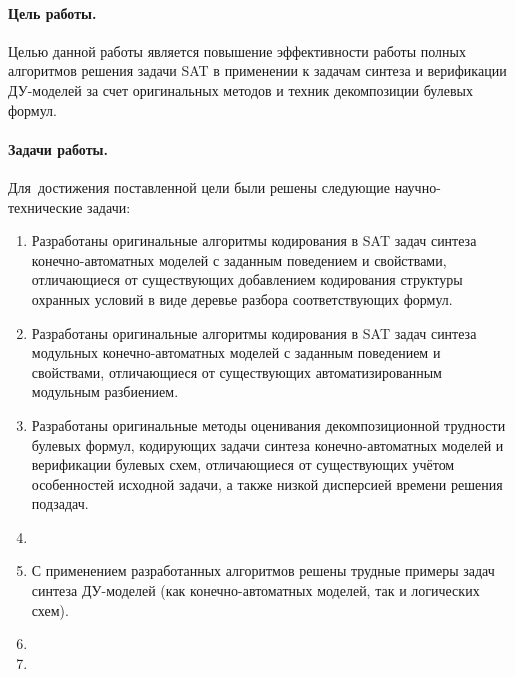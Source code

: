 

\paragraph*{Цель работы.}
%
Целью данной работы является повышение эффективности работы полных алгоритмов решения задачи SAT в применении к задачам синтеза и верификации ДУ-моделей за счет оригинальных методов и техник декомпозиции булевых формул.


\paragraph*{Задачи работы.}
%
Для~достижения поставленной цели были решены следующие научно-технические задачи:
\begin{enumerate}[beginpenalty=10000]
    \item Разработаны оригинальные алгоритмы кодирования в SAT задач синтеза конечно-автоматных моделей с заданным поведением и свойствами, отличающиеся от существующих добавлением кодирования структуры охранных условий в виде деревье разбора соответствующих формул.
    \item Разработаны оригинальные алгоритмы кодирования в SAT задач синтеза модульных конечно-автоматных моделей с заданным поведением и свойствами, отличающиеся от существующих автоматизированным модульным разбиением.
    \item Разработаны оригинальные методы оценивания декомпозиционной трудности булевых формул, кодирующих задачи синтеза конечно-автоматных моделей и верификации булевых схем, отличающиеся от существующих учётом особенностей исходной задачи, а также низкой дисперсией времени решения подзадач.
    \item {}
    \item С применением разработанных алгоритмов решены трудные примеры задач синтеза ДУ-моделей (как конечно-автоматных моделей, так и логических схем).
    \item {}
    \item {}
\end{enumerate}


